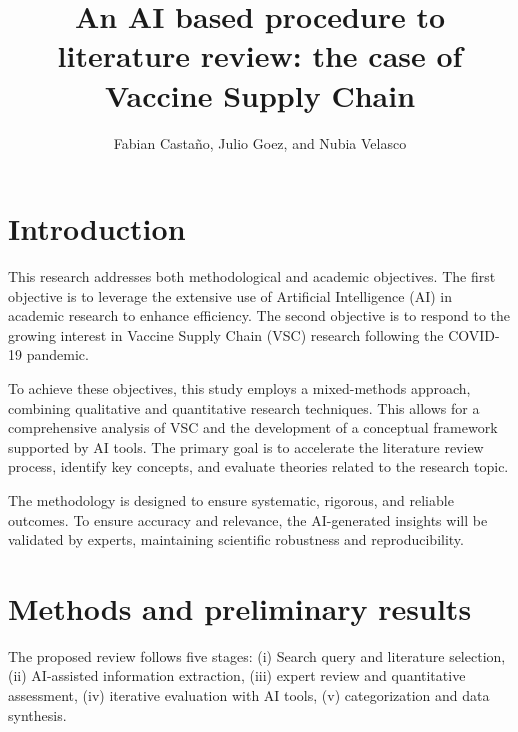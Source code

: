 \documentclass{optica-article}
\begin{document}
\title{An AI based procedure to literature review: the case of Vaccine Supply Chain}

\author{Fabian Castaño, Julio Goez, and Nubia Velasco}
\address{ Applied Intelligence Team, Mercado Libre\\ NHH, Norwegian School of Economics, Department of Business and Management Science\\ School of Management, Universidad de los Andes.}

\section{Introduction}

This research addresses both methodological and academic objectives. The first objective is to leverage the extensive use of Artificial Intelligence (AI) in academic research to enhance efficiency. The second objective is to respond to the growing interest in Vaccine Supply Chain (VSC) research following the COVID-19 pandemic. 

To achieve these objectives, this study employs a mixed-methods approach, combining qualitative and quantitative research techniques. This allows for a comprehensive analysis of VSC and the development of a conceptual framework supported by AI tools. The primary goal is to accelerate the literature review process, identify key concepts, and evaluate theories related to the research topic. 

The methodology is designed to ensure systematic, rigorous, and reliable outcomes. To ensure accuracy and relevance, the AI-generated insights will be validated by experts, maintaining scientific robustness and reproducibility.
\section{Methods and preliminary results}

The proposed review follows five stages: 
(i) Search query and literature selection, 
(ii) AI-assisted information extraction, 
(iii) expert review and quantitative assessment, 
(iv) iterative evaluation with AI tools, 
(v) categorization and data synthesis.
\end{document}

